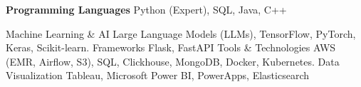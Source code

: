 \vspace{2mm}


\begin{cvskills}

  \cvskill
  {\textbf{Programming Languages}}
  {Python (Expert), SQL, Java, C++}

\cvskill
    {Machine Learning \& AI} %
    {Large Language Models (LLMs), TensorFlow, PyTorch, Keras, Scikit-learn.}
  \cvskill
    {Frameworks} %
    {Flask, FastAPI}
\cvskill
    {Tools \& Technologies} %
    {AWS (EMR, Airflow, S3), SQL, Clickhouse, MongoDB, Docker, Kubernetes.}
\cvskill
    {Data Visualization} %
    {Tableau, Microsoft Power BI, PowerApps, Elasticsearch}
\end{cvskills}